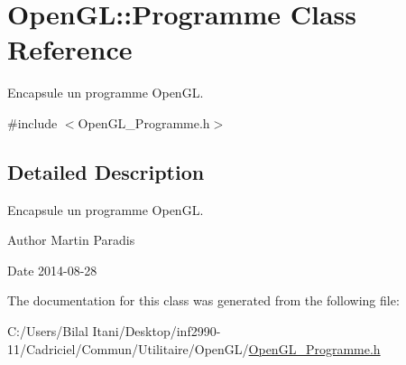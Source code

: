 \hypertarget{class_open_g_l_1_1_programme}{}\section{Open\+GL\+:\+:Programme Class Reference}
\label{class_open_g_l_1_1_programme}


Encapsule un programme Open\+GL.  




{\ttfamily \#include $<$Open\+G\+L\+\_\+\+Programme.\+h$>$}



\subsection{Detailed Description}
Encapsule un programme Open\+GL. 

\begin{DoxyAuthor}{Author}
Martin Paradis 
\end{DoxyAuthor}
\begin{DoxyDate}{Date}
2014-\/08-\/28 
\end{DoxyDate}


The documentation for this class was generated from the following file\+:\begin{DoxyCompactItemize}
\item 
C\+:/\+Users/\+Bilal Itani/\+Desktop/inf2990-\/11/\+Cadriciel/\+Commun/\+Utilitaire/\+Open\+G\+L/\hyperlink{_open_g_l___programme_8h}{Open\+G\+L\+\_\+\+Programme.\+h}\end{DoxyCompactItemize}
